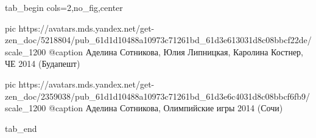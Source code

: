  
 
 
 
 


\ifcmt
  tab_begin cols=2,no_fig,center

     pic https://avatars.mds.yandex.net/get-zen_doc/5218804/pub_61d1d10488a10973c71261bd_61d3e613031d8c08bbcf22de/scale_1200
		 @caption Аделина Сотникова, Юлия Липницкая, Каролина Костнер, ЧЕ 2014 (Будапешт)

		 pic https://avatars.mds.yandex.net/get-zen_doc/2359038/pub_61d1d10488a10973c71261bd_61d3e6c4031d8c08bbcf6fb9/scale_1200
		 @caption Аделина Сотникова, Олимпийские игры 2014 (Сочи)

  tab_end
\fi
